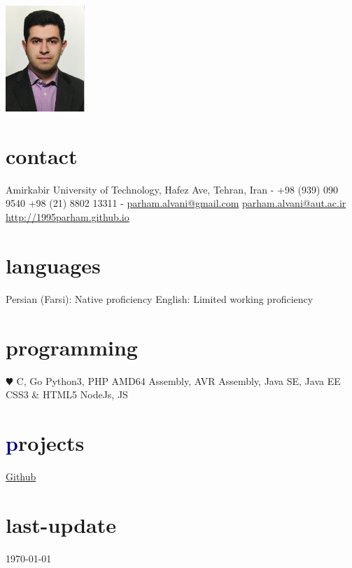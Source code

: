 \documentclass[]{friggeri-cv} %
\begin{document}


\begin{aside} %
	\includegraphics[width=3cm, height=4cm]{../parham_alvani_pers.jpg}
	\section{\textcolor{TextYellow}{c}ontact}
	Amirkabir University of Technology,
	Hafez Ave,
	Tehran, Iran
	-
	+98 (939) 090 9540
	+98 (21) 8802 13311
	-
	\href{mailto:parham.alvani@gmail.com}{parham.alvani@gmail.com}
	\href{mailto:parham.alvani@aut.ac.ir}{parham.alvani@aut.ac.ir}
	\href{http://1995parham.github.io/}{http://1995parham.github.io}
	\section{\textcolor{TextOrange}{l}anguages}
	Persian (Farsi):
	Native proficiency
	English:
	Limited working proficiency
	\section{\textcolor{TextGreen}{p}rogramming}
	{\color{red} $\varheartsuit$} C, Go
	Python3, PHP
	AMD64 Assembly,
	AVR Assembly,
	Java SE, Java EE
	CSS3 \& HTML5
	NodeJs, JS
	\section{\textcolor{DarkBlue}{p}rojects}
	\href{https://github.com/1995parham}{\textcolor{TextGreen}{\faGithub} Github}
	\section{\textcolor{Ocean}{last}-update}
	\today
\end{aside}
\end{document}
